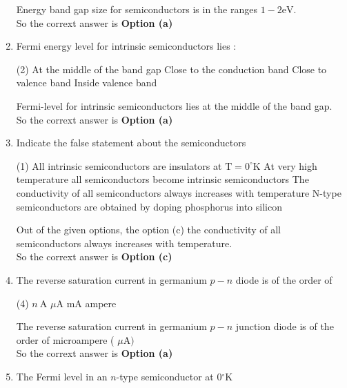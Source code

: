 \begin{enumerate}
	\begin{answer}
	Energy band gap size for semiconductors is in the ranges $1-2 \mathrm{eV}$. \\
	So the corrext answer is \textbf{Option (a)}
	\end{answer}
	\item Fermi energy level for intrinsic semiconductors lies :
	 \begin{tasks}(2)
		\task[\textbf{a.}]At the middle of the band gap
		\task[\textbf{b.}]Close to the conduction band
		\task[\textbf{c.}]Close to valence band
		\task[\textbf{d.}] Inside valence band
	\end{tasks}
	\begin{answer}
		Fermi-level for intrinsic semiconductors lies at the middle of the band gap. \\
		So the corrext answer is \textbf{Option (a)}
	\end{answer}
	\item Indicate the false statement about the semiconductors
	 \begin{tasks}(1)
		\task[\textbf{a.}]All intrinsic semiconductors are insulators at $\mathrm{T}=0^{\circ} \mathrm{K}$
		\task[\textbf{b.}]At very high temperature all semiconductors become intrinsic semiconductors
		\task[\textbf{c.}] The conductivity of all semiconductors always increases with temperature
		\task[\textbf{d.}] N-type semiconductors are obtained by doping phosphorus into silicon
	\end{tasks}
	\begin{answer}
			Out of the given options, the option (c) the conductivity of all semiconductors always increases with temperature.\\
		So the corrext answer is \textbf{Option (c)}
	\end{answer}
\item The reverse saturation current in germanium $p-n$ diode is of the order of
	 \begin{tasks}(4)
		\task[\textbf{a.}]$n \mathrm{~A}$
		\task[\textbf{b.}]$\mu \mathrm{A}$
		\task[\textbf{c.}] $\mathrm{mA}$
		\task[\textbf{d.}] ampere
	\end{tasks}
	\begin{answer}
	The reverse saturation current in germanium $p-n$ junction diode is of the order of microampere ( $\mu \mathrm{A})$\\
		So the corrext answer is \textbf{Option (a)}
	\end{answer}
\item The Fermi level in an $n$-type semiconductor at $0{ }^{\circ} \mathrm{K}$

\end{enumerate}
